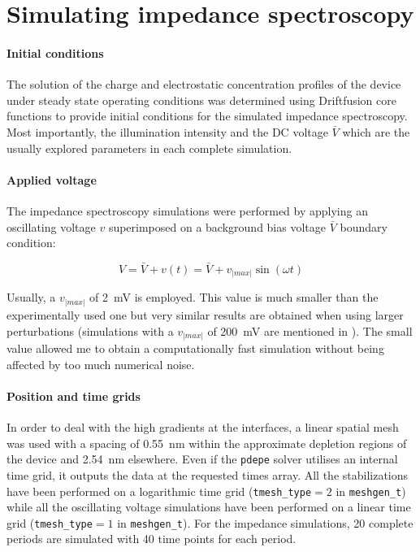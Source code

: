 \section{Simulating impedance spectroscopy}

\paragraph{Initial conditions}
The solution of the charge and electrostatic concentration profiles of the device under steady state operating conditions was determined using Driftfusion core functions to provide initial conditions for the simulated impedance spectroscopy.
Most importantly, the illumination intensity and the DC voltage $\bar V$ which are the usually explored parameters in each complete simulation.

\paragraph{Applied voltage}
The impedance spectroscopy simulations were performed by applying an oscillating voltage $v$ superimposed on a background bias voltage $\bar V$ boundary condition:

\begin{equation}
V = \bar V + v(t) = \bar V + v_|max| \sin(\omega t)
\end{equation}

Usually, a $v_|max|$ of \SI{2}{\mV} is employed.
This value is much smaller than the experimentally used one but very similar results are obtained when using larger perturbations (simulations with a $v_|max|$ of \SI{200}{\mV} are mentioned in ).
The small value allowed me to obtain a computationally fast simulation without being affected by too much numerical noise.

\paragraph{Position and time grids}
In order to deal with the high gradients at the interfaces, a linear spatial mesh was used with a spacing of \SI{0.55}{\nm} within the approximate depletion regions of the device and \SI{2.54}{\nm} elsewhere.
Even if the \texttt{pdepe} solver utilises an internal time grid, it outputs the data at the requested times array.
All the stabilizations have been performed on a logarithmic time grid (\texttt{tmesh\_type}$=2$ in \texttt{meshgen_t}) while all the oscillating voltage simulations have been performed on a linear time grid (\texttt{tmesh\_type}$=1$ in \texttt{meshgen_t}).
For the impedance simulations, 20 complete periods are simulated with 40 time points for each period.

